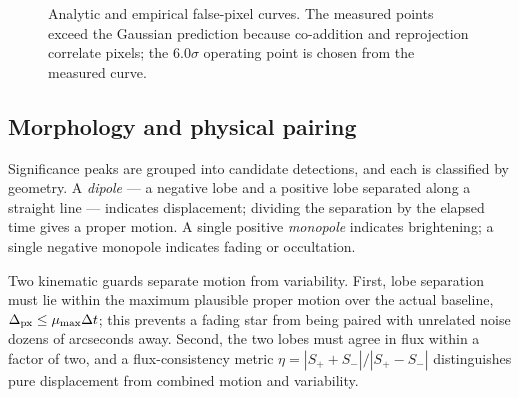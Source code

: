 \documentclass[11pt,a4paper]{article}
\begin{document}
{\begin{figure}[t]
\centering
{}
\caption{Analytic and empirical false-pixel curves. The measured points exceed the Gaussian
prediction because co-addition and reprojection correlate pixels; the $6.0\sigma$ operating point is
chosen from the measured curve.}
\label{fig:null}
\end{figure}


\subsection{Morphology and physical pairing}
Significance peaks are grouped into candidate detections, and each is classified by geometry. A
\emph{dipole} --- a negative lobe and a positive lobe separated along a straight line --- indicates
displacement; dividing the separation by the elapsed time gives a proper motion. A single positive
\emph{monopole} indicates brightening; a single negative monopole indicates fading or occultation.

Two kinematic guards separate motion from variability. First, lobe separation must lie within the
maximum plausible proper motion over the actual baseline, $\Delta_{\rm px} \le \mu_{\max}\Delta t$;
this prevents a fading star from being paired with unrelated noise dozens of arcseconds away.
Second, the two lobes must agree in flux within a factor of two, and a flux-consistency metric
$\eta = |S_+ + S_-|/|S_+ - S_-|$ distinguishes pure displacement from combined motion and
variability.

}
\end{document}
